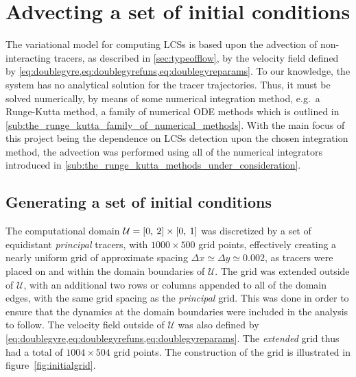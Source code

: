 \section{Advecting a set of initial conditions}
\label{sec:advecting_a_set_of_initial_conditions}

The variational model for computing LCSs is based upon the advection of
non-interacting tracers, as described in \cref{sec:typeofflow}, by the
velocity field defined by
\cref{eq:doublegyre,eq:doublegyrefuns,eq:doublegyreparams}. To our knowledge,
the system has no analytical solution for the tracer trajectories. Thus, it must
be solved numerically, by means of some numerical integration method, e.g.\ a
Runge-Kutta method, a family of numerical ODE methods which is outlined in
\cref{sub:the_runge_kutta_family_of_numerical_methods}. With the main focus of
this project being the dependence on LCSs detection upon the chosen integration
method, the advection was performed using all of the numerical integrators
introduced in \cref{sub:the_runge_kutta_methods_under_consideration}.

\subsection{Generating a set of initial conditions}
\label{sub:generating_a_set_of_initial_conditions}
The computational domain $\mathcal{U}=[0,\hspace{0.5ex}2]\times[0,\hspace{0.5ex}1]$
was discretized by a set of equidistant \emph{principal} tracers, with
$1000\times500$ grid points, effectively creating a nearly uniform grid of
approximate spacing $\Delta{x}\simeq\Delta{y}\simeq0.002$, as tracers were
placed on and within the domain boundaries of $\mathcal{U}$. The grid was
extended outside of $\mathcal{U}$, with an additional two rows or columns
appended to all of the domain edges, with the same grid spacing as the
\emph{principal} grid. This was done in order to ensure that the dynamics at the
domain boundaries were included in the analysis to follow. The velocity field
outside of $\mathcal{U}$ was also defined by
\cref{eq:doublegyre,eq:doublegyrefuns,eq:doublegyreparams}. The
\emph{extended} grid thus had a total of $1004\times504$ grid points.
The construction of the grid is illustrated in figure~\ref{fig:initialgrid}.
\clearpage


